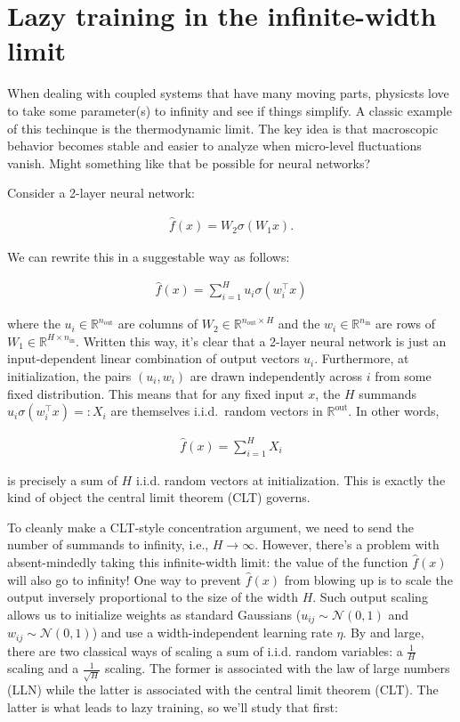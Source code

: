 \section{Lazy training in the infinite-width limit}

When dealing with coupled systems that have many moving parts, physicsts love to
take some parameter(s) to infinity and see if things simplify.
A classic example of this techinque is the thermodynamic limit. 
The key idea is that macroscopic behavior becomes stable and easier to analyze when
micro-level fluctuations vanish. Might something like that be possible for neural networks?


Consider a 2-layer neural network:

\begin{align}
\hat{f}(x) = W_2 \sigma(W_1 x).
\end{align}

We can rewrite this in a suggestable way as follows:

\begin{align}
\hat{f}(x) = \sum^H_{i=1}u_i \sigma(w^\top_i x)
\end{align}

where the $u_i\in\mathbb{R}^{n_\text{out}}$ are columns of $W_2\in\mathbb{R}^{{n_\text{out}}\times H}$ and the $w_i\in\mathbb{R}^{n_\text{in}}$ are rows of $W_1\in\mathbb{R}^{H\times{n_\text{in}}}$.
Written this way, it's clear that a 2-layer neural network is just an input-dependent linear combination
of output vectors $u_i$. Furthermore, at initialization, the pairs $(u_i, w_i)$ are drawn independently across $i$ from some fixed distribution. 
This means that for any fixed input $x$, the $H$ summands $u_i \sigma(w^\top_i x)=:X_i$
are themselves i.i.d.\ random vectors in $\mathbb{R}^\text{out}$. In other words,

\begin{align}
    \hat f(x) = \sum_{i=1}^H X_i
\end{align}

is precisely a sum of $H$ i.i.d. random vectors at initialization. 
This is exactly the kind of object the central limit theorem (CLT) governs. 

To cleanly make a CLT-style concentration argument, we need to send the number of summands to infinity, i.e., $H \to \infty$.
However, there's a problem with absent-mindedly taking this infinite-width limit: 
the value of the function $\hat{f}(x)$ will also go to infinity! 
One way to prevent $\hat{f}(x)$ from blowing up is to scale the output inversely proportional
to the size of the width $H$. 
Such output scaling allows us to initialize weights as 
standard Gaussians ($u_{ij}\sim\mathcal{N}(0,1)$ and $w_{ij}\sim\mathcal{N}(0,1)$)
and use a width-independent learning rate $\eta$.
By and large, there are two classical ways of scaling a sum of 
i.i.d. random variables:
a $\frac{1}{H}$ scaling and a $\frac{1}{\sqrt{H}}$ scaling.
The former is associated with the law of large numbers (LLN) while the latter is associated with
the central limit theorem (CLT). 
The latter is what leads to lazy training, so we'll study that first:


